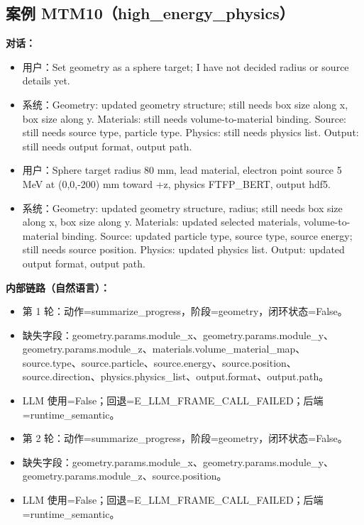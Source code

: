 \documentclass[11pt]{ctexart}
\begin{document}
\subsection{案例 MTM10（high\_energy\_physics）}
\textbf{对话：}
\begin{itemize}
\item 用户：Set geometry as a sphere target; I have not decided radius or source details yet.
\item 系统：Geometry: updated geometry structure; still needs box size along x, box size along y. Materials: still needs volume-to-material binding. Source: still needs source type, particle type. Physics: still needs physics list. Output: still needs output format, output path.
\item 用户：Sphere target radius 80 mm, lead material, electron point source 5 MeV at (0,0,-200) mm toward +z, physics FTFP\_BERT, output hdf5.
\item 系统：Geometry: updated geometry structure, radius; still needs box size along x, box size along y. Materials: updated selected materials, volume-to-material binding. Source: updated particle type, source type, source energy; still needs source position. Physics: updated physics list. Output: updated output format, output path.
\end{itemize}
\textbf{内部链路（自然语言）：}
\begin{itemize}
\item 第 1 轮：动作=summarize\_progress，阶段=geometry，闭环状态=False。
\item 缺失字段：geometry.params.module\_x、geometry.params.module\_y、geometry.params.module\_z、materials.volume\_material\_map、source.type、source.particle、source.energy、source.position、source.direction、physics.physics\_list、output.format、output.path。
\item LLM 使用=False；回退=E\_LLM\_FRAME\_CALL\_FAILED；后端=runtime\_semantic。
\item 第 2 轮：动作=summarize\_progress，阶段=geometry，闭环状态=False。
\item 缺失字段：geometry.params.module\_x、geometry.params.module\_y、geometry.params.module\_z、source.position。
\item LLM 使用=False；回退=E\_LLM\_FRAME\_CALL\_FAILED；后端=runtime\_semantic。
\end{itemize}
\end{document}
